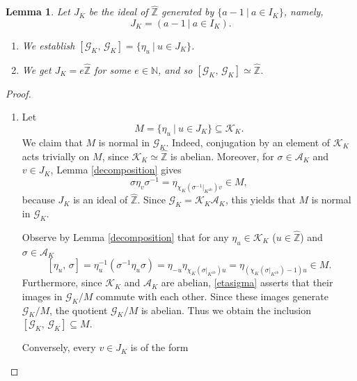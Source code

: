 \documentclass[reqno,11pt]{article}
\theoremstyle{plain} %
\newtheorem{lemma}[theorem]{\indent\sc Lemma}
\theoremstyle{definition} %
\begin{document}
\begin{lemma}\label{comm}
Let $J_K$ be the ideal of $\widehat{\mathbb{Z}}$ generated by 
$\{a-1~|~a\in I_K\}$, namely,
\begin{equation*}
J_K=(a-1~|~a\in I_K).
\end{equation*}
\begin{enumerate}
\item[\textup{(i)}] We establish $[\mathcal{G}_K,\,\mathcal{G}_K]=\{\eta_u~|~u\in J_K\}$.
\item[\textup{(ii)}] We get
$J_K=e\widehat{\mathbb Z}$ for some $e\in\mathbb{N}$,
and so $[\mathcal{G}_K,\,\mathcal{G}_K]\simeq\widehat{\mathbb{Z}}$.
\end{enumerate}
\end{lemma}
\begin{proof}
\begin{enumerate}
\item[(i)]
Let
\begin{equation*}
M=\{\eta_u~|~u\in J_K\}\subseteq\mathcal{K}_K.
\end{equation*}
We claim that $M$ is normal in $\mathcal{G}_K$. Indeed, conjugation by
an element of $\mathcal K_K$ acts trivially on $M$, since
$\mathcal K_K\simeq\widehat{\mathbb{Z}}$ is abelian. Moreover, for
$\sigma\in\mathcal{A}_K$ and $v\in J_K$, Lemma \ref{decomposition} gives
\begin{equation*}
\sigma\eta_v\sigma^{-1}=
\eta_{\chi_K(\sigma^{-1}|_{K^\mathrm{ab}})\textstyle v}\in M,
\end{equation*}
because $J_K$ is an ideal of $\widehat{\mathbb Z}$.
Since $\mathcal{G}_K=\mathcal{K}_K\mathcal{A}_K$, this yields that
$M$ is normal in $\mathcal{G}_K$. 
\par
Observe by Lemma \ref{decomposition} that
for any $\eta_u\in\mathcal{K}_K$ ($u\in\widehat{\mathbb{Z}}$) and $\sigma\in\mathcal{A}_K$
\begin{equation}\label{etasigma}
[\eta_u,\,\sigma]=\eta_u^{-1}\left(\sigma^{-1}\eta_u\sigma\right)
=\eta_{-u}\eta_{\chi_K(\sigma|_{K^\mathrm{ab}})u}
=\eta_{\left(\chi_K(\sigma|_{K^\mathrm{ab}})-1\right)u}\in M.
\end{equation}
Furthermore, since $\mathcal{K}_K$ and $\mathcal{A}_K$ are abelian, \eqref{etasigma}
asserts that
their images in $\mathcal{G}_K/M$ commute with each other.
Since these images generate $\mathcal{G}_K/M$, the quotient $\mathcal{G}_K/M$ is
abelian. Thus we obtain the inclusion
$[\mathcal{G}_K,\,\mathcal{G}_K]\subseteq M$.
\par
Conversely, every $v\in J_K$ is of the form

\end{enumerate}
\end{proof}
\end{document}
